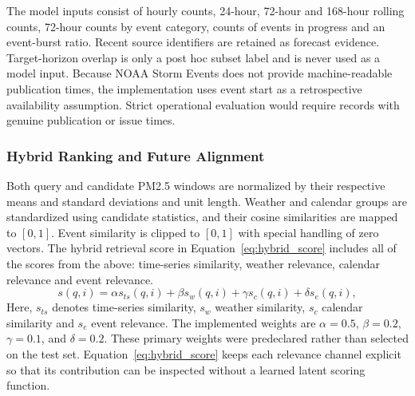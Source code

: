 \documentclass{ieeeaccess}
\begin{document}
The model inputs consist of hourly counts, 24-hour, 72-hour and 168-hour rolling counts, 72-hour counts by event category, counts of events in progress and an event-burst ratio. Recent source identifiers are retained as forecast evidence. Target-horizon overlap is only a post hoc subset label and is never used as a model input. Because NOAA Storm Events does not provide machine-readable publication times, the implementation uses event start as a retrospective availability assumption. Strict operational evaluation would require records with genuine publication or issue times.

\subsubsection{Hybrid Ranking and Future Alignment}
Both query and candidate PM2.5 windows are normalized by their respective means and standard deviations and unit length. Weather and calendar groups are standardized using candidate statistics, and their cosine similarities are mapped to $[0,1]$. Event similarity is clipped to $[0,1]$ with special handling of zero vectors. The hybrid retrieval score in Equation~\eqref{eq:hybrid_score} includes all of the scores from the above: time-series similarity, weather relevance, calendar relevance and event relevance.
\begin{equation}
    s(q, i) =
    \alpha s_{ts}(q,i) +
    \beta s_{w}(q,i) +
    \gamma s_{c}(q,i) +
    \delta s_{e}(q,i),
    \label{eq:hybrid_score}
\end{equation}
Here, $s_{ts}$ denotes time-series similarity, $s_{w}$ weather similarity, $s_{c}$ calendar similarity and $s_{e}$ event relevance. The implemented weights are $\alpha=0.5$, $\beta=0.2$, $\gamma=0.1$, and $\delta=0.2$. These primary weights were predeclared rather than selected on the test set. Equation~\eqref{eq:hybrid_score} keeps each relevance channel explicit so that its contribution can be inspected without a learned latent scoring function.
\end{document}
